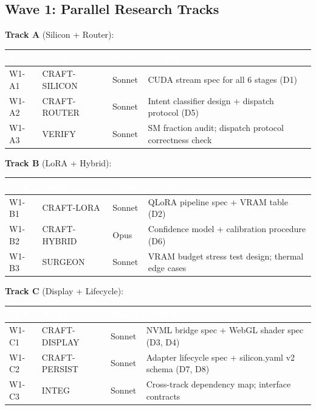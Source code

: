 \documentclass[11pt,letterpaper]{article}
\newcommand{\tableheader}[1]{\textbf{\sffamily\textcolor{white}{#1}}}
\begin{document}
\subsection{Wave 1: Parallel Research Tracks}

\textbf{Track A} (Silicon + Router):

\begin{center}
\begin{tabularx}{\textwidth}{L{2.5cm}L{2.5cm}C{1.4cm}X}
\toprule
{}
\tableheader{Task} & \tableheader{Agent} & \tableheader{Model} & \tableheader{Output} \\
\midrule
W1-A1 & CRAFT-SILICON & Sonnet & CUDA stream spec for all 6 stages (D1) \\
W1-A2 & CRAFT-ROUTER & Sonnet & Intent classifier design + dispatch protocol (D5) \\
W1-A3 & VERIFY & Sonnet & SM fraction audit; dispatch protocol correctness check \\
\bottomrule
\end{tabularx}
\end{center}

\textbf{Track B} (LoRA + Hybrid):

\begin{center}
\begin{tabularx}{\textwidth}{L{2.5cm}L{2.5cm}C{1.4cm}X}
\toprule
{}
\tableheader{Task} & \tableheader{Agent} & \tableheader{Model} & \tableheader{Output} \\
\midrule
W1-B1 & CRAFT-LORA & Sonnet & QLoRA pipeline spec + VRAM table (D2) \\
W1-B2 & CRAFT-HYBRID & Opus & Confidence model + calibration procedure (D6) \\
W1-B3 & SURGEON & Sonnet & VRAM budget stress test design; thermal edge cases \\
\bottomrule
\end{tabularx}
\end{center}

\textbf{Track C} (Display + Lifecycle):

\begin{center}
\begin{tabularx}{\textwidth}{L{2.5cm}L{2.5cm}C{1.4cm}X}
\toprule
{}
\tableheader{Task} & \tableheader{Agent} & \tableheader{Model} & \tableheader{Output} \\
\midrule
W1-C1 & CRAFT-DISPLAY & Sonnet & NVML bridge spec + WebGL shader spec (D3, D4) \\
W1-C2 & CRAFT-PERSIST & Sonnet & Adapter lifecycle spec + silicon.yaml v2 schema (D7, D8) \\
W1-C3 & INTEG & Sonnet & Cross-track dependency map; interface contracts \\
\bottomrule
\end{tabularx}
\end{center}
\end{document}
